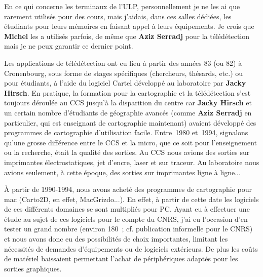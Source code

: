 En ce qui concerne les terminaux de l’ULP, personnellement je ne les ai que rarement utilisés pour des cours, mais j’aidais, dans ces salles dédiées, les étudiants pour leurs mémoires en faisant appel à leurs équipements. Je crois que \textbf{Michel} les a utilisés parfois, de même que \textbf{Aziz Serradj} pour la télédétection mais je ne peux garantir ce dernier point.

Les applications de télédétection ont eu lieu à partir des années 83 (ou 82) à Cronenbourg, sous forme de stages spécifiques (chercheurs, thésards, etc.) ou pour étudiants, à l’aide du logiciel Cartel développé au laboratoire par \textbf{Jacky Hirsch}. En pratique, la formation pour la cartographie et la télédétection s’est toujours déroulée au CCS jusqu’à la disparition du centre car \textbf{Jacky Hirsch} et un certain nombre d’étudiants de géographie avancés (comme \textbf{Aziz Serradj} en particulier, qui est enseignant de cartographie maintenant) avaient développé des programmes de cartographie d'utilisation facile. Entre 1980 et 1994, signalons qu’une grosse différence entre le CCS et la micro, que ce soit pour l’enseignement ou la recherche, était la qualité des sorties. Au CCS nous avions des sorties sur imprimantes électrostatiques, jet d’encre, laser et sur traceur. Au laboratoire nous avions seulement, à cette époque, des sorties sur imprimantes ligne à ligne...

À partir de 1990-1994, nous avons acheté des programmes de cartographie pour mac (Carto2D, en effet, MacGrizdo...). En effet, à partir de cette date les logiciels de ces différents domaines se sont multipliés pour PC. Ayant eu à effectuer une étude au sujet de ces logiciels pour le compte du CNRS, j’ai eu l’occasion d’en tester un grand nombre (environ 180 ; cf. publication informelle pour le CNRS) et nous avons donc eu des possibilités de choix importantes, limitant les nécessités de demandes d’équipements ou de logiciels extérieurs. De plus les coûts de matériel baissaient permettant l’achat de périphériques adaptés pour les sorties graphiques.